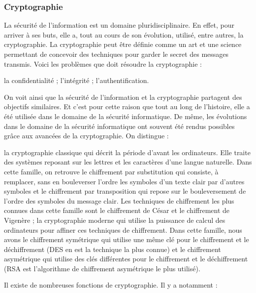 \subsubsection{Cryptographie}
La sécurité de l'information est un domaine pluridisciplinaire. En effet, pour arriver à ses buts, elle a, tout au cours de son évolution, utilisé, entre autres, la cryptographie. La cryptographie peut être définie comme un art et une science permettant de concevoir des techniques pour garder le secret des messages transmis. Voici les problèmes que doit résoudre la cryptographie : 
\begin{itemize}
	\itemcheck la confidentialité ;
	\itemcheck l’intégrité ; 
	\itemcheck l’authentification.
\end{itemize}
On voit ainsi que la sécurité de l'information et la cryptographie partagent des objectifs similaires. Et c’est pour cette raison que tout au long de l’histoire, elle a été utilisée dans le domaine de la sécurité informatique. De même, les évolutions dans le domaine de la sécurité informatique ont souvent été rendus possibles grâce aux avancées de la cryptographie.
On distingue :
\begin{itemize}
	\itemtirait la cryptographie classique qui décrit la période d’avant les ordinateurs. Elle traite des systèmes reposant sur les lettres et les caractères d’une langue naturelle. Dans cette famille, on retrouve le chiffrement par substitution qui consiste, à remplacer, sans en bouleverser l’ordre les symboles d’un texte clair par d’autres symboles et le chiffrement par transposition qui repose sur le bouleversement de l’ordre des symboles du message clair. Les techniques de chiffrement les plus connues dans cette famille sont le chiffrement de César et le chiffrement de Vigenère ; 
	\itemtirait la cryptographie moderne qui utilise la puissance de calcul des ordinateurs pour affiner ces techniques de chiffrement. Dans cette famille, nous avons le chiffrement symétrique qui utilise une même clé pour le chiffrement et le déchiffrement (DES en est la technique la plus connue) et le chiffrement asymétrique qui utilise des clés différentes pour le chiffrement et le déchiffrement (RSA est l’algorithme de chiffrement asymétrique le plus utilisé).
\end{itemize}
Il existe de nombreuses fonctions de cryptographie. Il y a notamment :
